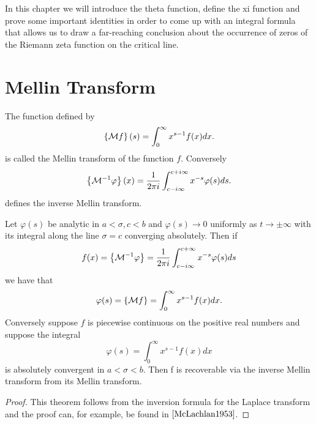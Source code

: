 In this chapter we will introduce the theta function, define the xi function and prove some important identities in order to come up with an integral formula that allows us to draw a far-reaching conclusion about the occurrence of zeros of the Riemann zeta function on the critical line.

\section{Mellin Transform}


\begin{definition}
	The function defined by
\begin{equation*}
	\left\{\mathcal{M}f\right\}(s) = \int _0 ^\infty x^{s - 1} f(x) dx.
\end{equation*}
	is called the Mellin transform of the function $f$. Conversely
\begin{equation*}
	\left\{\mathcal{M}^{-1} \varphi\right\}(x) = \frac{1}{2 \pi i} \int _{c - i \infty} ^{c + i \infty} x^{-s} \varphi(s) ds.
\end{equation*}
	defines the inverse Mellin transform.
\end{definition}


\begin{theorem}
	Let $\varphi(s)$ be analytic in $a < \sigma, c < b$ and $\varphi(s) \to 0$ uniformly as $t \to \pm\infty$ with its integral along the line $\sigma = c$ converging absolutely. Then if
\begin{equation*}
	f(x) = \left\{\mathcal{M}^{-1} \varphi\right\} = \frac{1}{2 \pi i} \int _{c - i \infty} ^{c + \infty} x^{-s} \varphi(s) ds
\end{equation*}
	we have that
\begin{equation*}
	\varphi(s) = \left\{\mathcal{M} f\right\} = \int _0 ^\infty x^{s - 1} f(x) dx.
\end{equation*}
	Conversely suppose $f$ is piecewise continuous on the positive real numbers and suppose the integral
\begin{equation*}
	\varphi(s) = \int _0 ^\infty x^{s - 1} f(x) dx
\end{equation*}
	is absolutely convergent in $a < \sigma < b$. Then f is recoverable via the inverse Mellin transform from its Mellin transform.
\end{theorem}
\begin{proof}
	This theorem follows from the inversion formula for the Laplace transform and the proof can, for example, be found in $\cite{McLachlan1953}$.
\end{proof}


